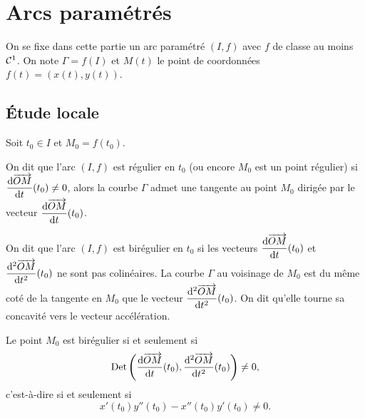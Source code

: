 \section{Arcs paramétrés}

On se fixe dans cette partie un arc paramétré \((I, f)\) avec \(f\) de classe au 
moins \(\mathcal{C}^{1}\). On note \(\Gamma = f(I)\) et \(M(t)\) le point de 
coordonnées \(f(t) = (x(t), y(t))\).

\subsection{Étude locale}

Soit \(t_0 \in I\) et \(M_0 = f(t_0)\).
\begin{defdef}
  On dit que l'arc \((I, f)\) est régulier en \(t_0\) (ou encore \(M_0\) est un 
  point régulier) si \(\dfrac{\mathrm{d} \overrightarrow{OM}}{\mathrm{d} t}(t_0) \neq 0\), alors la courbe 
  \(\Gamma\) admet une tangente au point \(M_0\) dirigée par le vecteur 
  \(\dfrac{\mathrm{d} \overrightarrow{OM}}{\mathrm{d} t}(t_0)\).%
\end{defdef}

\begin{defdef}
  On dit que l'arc \((I, f)\) est birégulier en \(t_0\) si les vecteurs 
  \(\dfrac{\mathrm{d} \overrightarrow{OM}}{\mathrm{d} t}(t_0)\) et \(\dfrac{\mathrm{d}^2 \overrightarrow{OM}}{\mathrm{d} {t}^2}(t_0)\) ne sont 
  pas colinéaires. La courbe \(\Gamma\) au voisinage de \(M_0\) est du même coté 
  de la tangente en \(M_0\) que le vecteur \(\dfrac{\mathrm{d}^2 \overrightarrow{OM}}{\mathrm{d} {t}^2}(t_0)\). On 
  dit qu'elle \og tourne sa concavité\fg{} vers le vecteur accélération.
\end{defdef}

\begin{prop}
  Le point \(M_0\) est birégulier si et seulement si
  \begin{equation}
    \operatorname{Det}\left(\dfrac{\mathrm{d} \overrightarrow{OM}}{\mathrm{d} t}(t_0),\dfrac{\mathrm{d}^2 \overrightarrow{OM}}{\mathrm{d} {t}^2}(t_0)\right) 
    \neq 0,
  \end{equation}
  c'est-à-dire si et seulement si
  \begin{equation}
    x'(t_0)y''(t_0) - x''(t_0)y'(t_0) \neq 0.
  \end{equation}
\end{prop}

